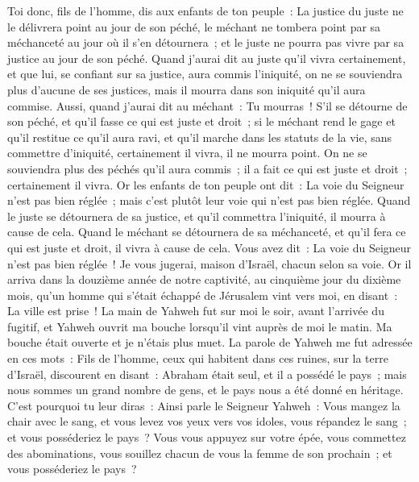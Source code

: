 \begin{multicols}{2}
Toi donc, fils de l'homme, dis aux enfants de ton peuple~: La justice du juste ne le délivrera point au jour de son péché, le méchant ne tombera point par sa méchanceté au jour où il s'en détournera~; et le juste ne pourra pas vivre par sa justice au jour de son péché.
Quand j'aurai dit au juste qu'il vivra certainement, et que lui, se confiant sur sa justice, aura commis l'iniquité, on ne se souviendra plus d'aucune de ses justices, mais il mourra dans son iniquité qu'il aura commise.
Aussi, quand j'aurai dit au méchant~: Tu mourras~! S'il se détourne de son péché, et qu'il fasse ce qui est juste et droit~;
si le méchant rend le gage et qu'il restitue ce qu'il aura ravi, et qu'il marche dans les statuts de la vie, sans commettre d'iniquité, certainement il vivra, il ne mourra point.
On ne se souviendra plus des péchés qu'il aura commis~; il a fait ce qui est juste et droit~; certainement il vivra.
Or les enfants de ton peuple ont dit~: La voie du Seigneur n'est pas bien réglée~; mais c'est plutôt leur voie qui n'est pas bien réglée.
Quand le juste se détournera de sa justice, et qu'il commettra l'iniquité, il mourra à cause de cela.
Quand le méchant se détournera de sa méchanceté, et qu'il fera ce qui est juste et droit, il vivra à cause de cela.
Vous avez dit~: La voie du Seigneur n'est pas bien réglée~! Je vous jugerai, maison d'Israël, chacun selon sa voie.
Or il arriva dans la douzième année de notre captivité, au cinquième jour du dixième mois, qu'un homme qui s'était échappé de Jérusalem vint vers moi, en disant~: La ville est prise~!
La main de Yahweh fut sur moi le soir, avant l'arrivée du fugitif, et Yahweh ouvrit ma bouche lorsqu'il vint auprès de moi le matin. Ma bouche était ouverte et je n'étais plus muet.
La parole de Yahweh me fut adressée en ces mots~:
Fils de l'homme, ceux qui habitent dans ces ruines, sur la terre d'Israël, discourent en disant~: Abraham était seul, et il a possédé le pays~; mais nous sommes un grand nombre de gens, et le pays nous a été donné en héritage.
C'est pourquoi tu leur diras~: Ainsi parle le Seigneur Yahweh~: Vous mangez la chair avec le sang, et vous levez vos yeux vers vos idoles, vous répandez le sang~; et vous posséderiez le pays~?
Vous vous appuyez sur votre épée, vous commettez des abominations, vous souillez chacun de vous la femme de son prochain~; et vous posséderiez le pays~?

\end{multicols}
